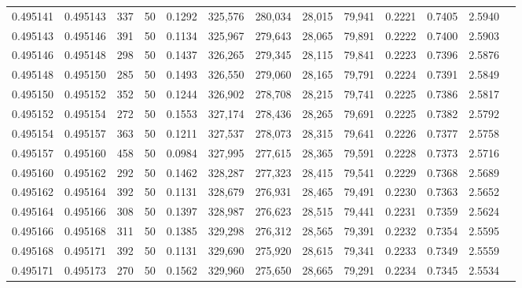 \begin{tabular}{rrrrrrrrrrrrr}
0.495141 & 0.495143 &   337 &  50 &                                     0.1292 & 325,576 & 280,034 &  28,015 &  79,941 & 0.2221 & 0.7405 & 2.5940 \\
0.495143 & 0.495146 &   391 &  50 &                                     0.1134 & 325,967 & 279,643 &  28,065 &  79,891 & 0.2222 & 0.7400 & 2.5903 \\
0.495146 & 0.495148 &   298 &  50 &                                     0.1437 & 326,265 & 279,345 &  28,115 &  79,841 & 0.2223 & 0.7396 & 2.5876 \\
0.495148 & 0.495150 &   285 &  50 &                                     0.1493 & 326,550 & 279,060 &  28,165 &  79,791 & 0.2224 & 0.7391 & 2.5849 \\
0.495150 & 0.495152 &   352 &  50 &                                     0.1244 & 326,902 & 278,708 &  28,215 &  79,741 & 0.2225 & 0.7386 & 2.5817 \\
0.495152 & 0.495154 &   272 &  50 &                                     0.1553 & 327,174 & 278,436 &  28,265 &  79,691 & 0.2225 & 0.7382 & 2.5792 \\
0.495154 & 0.495157 &   363 &  50 &                                     0.1211 & 327,537 & 278,073 &  28,315 &  79,641 & 0.2226 & 0.7377 & 2.5758 \\
0.495157 & 0.495160 &   458 &  50 &                                     0.0984 & 327,995 & 277,615 &  28,365 &  79,591 & 0.2228 & 0.7373 & 2.5716 \\
0.495160 & 0.495162 &   292 &  50 &                                     0.1462 & 328,287 & 277,323 &  28,415 &  79,541 & 0.2229 & 0.7368 & 2.5689 \\
0.495162 & 0.495164 &   392 &  50 &                                     0.1131 & 328,679 & 276,931 &  28,465 &  79,491 & 0.2230 & 0.7363 & 2.5652 \\
0.495164 & 0.495166 &   308 &  50 &                                     0.1397 & 328,987 & 276,623 &  28,515 &  79,441 & 0.2231 & 0.7359 & 2.5624 \\
0.495166 & 0.495168 &   311 &  50 &                                     0.1385 & 329,298 & 276,312 &  28,565 &  79,391 & 0.2232 & 0.7354 & 2.5595 \\
0.495168 & 0.495171 &   392 &  50 &                                     0.1131 & 329,690 & 275,920 &  28,615 &  79,341 & 0.2233 & 0.7349 & 2.5559 \\
0.495171 & 0.495173 &   270 &  50 &                                     0.1562 & 329,960 & 275,650 &  28,665 &  79,291 & 0.2234 & 0.7345 & 2.5534 \\

\end{tabular}
